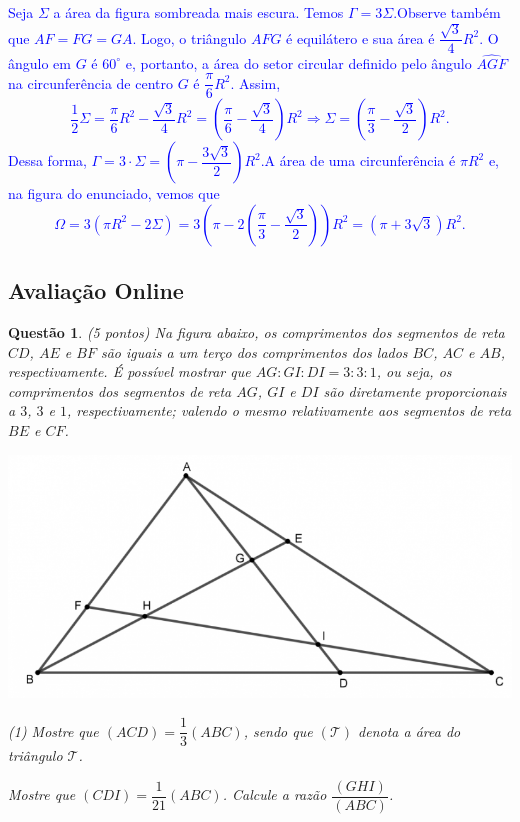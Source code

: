 \documentclass[oneside,a4paper,12pt]{article}
\newcommand{\negrito}[1]{\mbox{\boldmath{$#1$}}}
\theoremstyle{Colorido}
\theoremstyle{solu}
\theoremstyle{dotlessP}
\newtheorem{sol}{Questão}
\begin{document}
\textcolor{blue}{Seja $\Sigma$ a área da figura sombreada mais escura. Temos $\Gamma = 3 \Sigma$.\newline\newline Observe também que $AF=FG=GA$. Logo, o triângulo $AFG$ é equilátero e sua área é $\dfrac{\sqrt{3}}{4}R^2$. O ângulo em $G$ é $60^\circ$ e, portanto, a área do setor circular definido pelo ângulo $\widehat{AGF}$ na circunferência de centro $G$ é $\dfrac{\pi}{6}R^2$. Assim,\[\dfrac{1}{2}\Sigma = \dfrac{\pi}{6}R^2 - \dfrac{\sqrt{3}}{4}R^2 = \left(\dfrac{\pi}{6} -  \dfrac{\sqrt{3}}{4}\right) R^2 \Rightarrow \Sigma = \left(\dfrac{\pi}{3} -  \dfrac{\sqrt{3}}{2}\right) R^2.\] Dessa forma, $\Gamma = 3 \cdot \Sigma = \left(\pi -  \dfrac{3\sqrt{3}}{2}\right) R^2$.\newline\newline A área de uma circunferência é $\pi R^2$ e, na figura do enunciado, vemos que\[\Omega = 3 \left( \pi R^2 - 2 \Sigma  \right) = 3 \left( \pi  - 2 \left( \dfrac{\pi}{3} - \dfrac{\sqrt{3}}{2} \right)  \right) R^2= \left(\pi + 3\sqrt{3} \right)R^2.\]}
\newpage
	\textcolor{Floresta}{\section{Avaliação Online}}
	\begin{sol}
\textit{(5 pontos)} \newline \newline	
Na figura abaixo, os comprimentos dos segmentos de reta $CD$, $AE$ e $BF$ são iguais a um terço dos comprimentos dos lados $BC$, $AC$ e $AB$, respectivamente. É possível mostrar que $AG:GI:DI=3:3:1$, ou seja, os comprimentos dos segmentos de reta $AG$, $GI$ e $DI$ são diretamente proporcionais a $3$, $3$ e $1$, respectivamente; valendo o mesmo relativamente aos segmentos de reta $BE$ e $CF$.
\begin{center}
\includegraphics[scale=0.4]{Provas e Avaliações/Figuras avaliações/12avaliacaociclo3.png}
\end{center}
	\begin{tasks}[counter-format={(tsk[a])},label-width=3.6ex, label-format = {\bfseries}, column-sep = {20pt}](1)
\task[\textcolor{blue}{$\negrito{(a)} $}] Mostre que $(ACD)=\dfrac{1}{3}(ABC)$, sendo que $(\mathcal T)$ denota a área do triângulo $\mathcal T$. 

\task[\textcolor{blue}{$\negrito{(b)} $}] Mostre que $(CDI)=\dfrac{1}{21}(ABC)$.
\task[\textcolor{blue}{$\negrito{(c)} $}] Calcule a razão $\dfrac{(GHI)}{(ABC)}$.
\end{tasks}
\end{sol}
\end{document}
